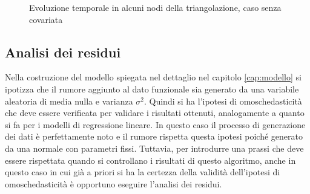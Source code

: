 \documentclass[a4paper,11pt,twoside,openright]{book}							%
\begin{document}
\begin{figure}[t]
	\centering
	\caption{Evoluzione temporale in alcuni nodi della triangolazione, caso senza covariata}
	\label{fig:DomC_ris2}
\end{figure}

\subsection{Analisi dei residui}
Nella costruzione del modello spiegata nel dettaglio nel capitolo \ref{cap:modello} si ipotizza che il rumore aggiunto al dato funzionale sia generato da una variabile aleatoria di media nulla e varianza $\sigma^2$. Quindi si ha l'ipotesi di omoschedasticità che deve essere verificata per validare i risultati ottenuti, analogamente a quanto si fa per i modelli di regressione lineare. In questo caso il processo di generazione dei dati è perfettamente noto e il rumore rispetta questa ipotesi poiché generato da una normale con parametri fissi. Tuttavia, per introdurre una prassi che deve essere rispettata quando si controllano i risultati di questo algoritmo, anche in questo caso in cui già a priori si ha la certezza della validità dell'ipotesi di omoschedasticità è opportuno eseguire l'analisi dei residui.
\end{document}
